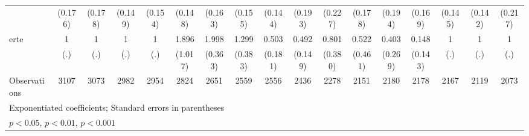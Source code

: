 {\begin{tabular}{l*{16}{c}}
                    &     (0.176)         &     (0.178)         &     (0.149)         &     (0.154)         &     (0.148)         &     (0.163)         &     (0.155)         &     (0.144)         &     (0.193)         &     (0.227)         &     (0.178)         &     (0.194)         &     (0.169)         &     (0.145)         &     (0.142)         &     (0.217)         \\
[1em]
erte                &           1         &           1         &           1         &           1         &       1.896         &       1.998\sym{***}&       1.299         &       0.503         &       0.492\sym{*}  &       0.801         &       0.522         &       0.403         &       0.148\sym{*}  &           1         &           1         &           1         \\
                    &         (.)         &         (.)         &         (.)         &         (.)         &     (1.017)         &     (0.363)         &     (0.383)         &     (0.181)         &     (0.149)         &     (0.380)         &     (0.461)         &     (0.269)         &     (0.143)         &         (.)         &         (.)         &         (.)         \\
\hline
Observations        &        3107         &        3073         &        2982         &        2954         &        2824         &        2651         &        2559         &        2556         &        2436         &        2278         &        2151         &        2180         &        2178         &        2167         &        2119         &        2073         \\
\hline\hline
\multicolumn{17}{l}{\footnotesize Exponentiated coefficients; Standard errors in parentheses}\\
\multicolumn{17}{l}{\footnotesize \sym{*} \(p<0.05\), \sym{**} \(p<0.01\), \sym{***} \(p<0.001\)}\\
\end{tabular}
}

